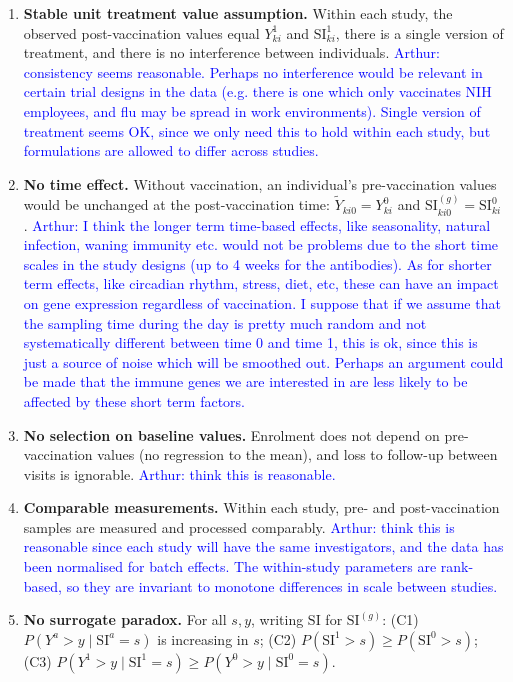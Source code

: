 \documentclass{article}
\begin{document}
\begin{enumerate}
    \item \textbf{Stable unit treatment value assumption.} Within each study, the observed post-vaccination values equal $Y^{1}_{ki}$ and $\mathrm{SI}^{1}_{ki}$, there is a single version of treatment, and there is no interference between individuals.
    \textcolor{blue}{Arthur: consistency seems reasonable. Perhaps no interference would be relevant in certain trial designs in the data (e.g. there is one which only vaccinates NIH employees, and flu may be spread in work environments). Single version of treatment seems OK, since we only need this to hold within each study, but formulations are allowed to differ across studies.}
    \item \textbf{No time effect.} Without vaccination, an individual's pre-vaccination values would be unchanged at the post-vaccination time: $\tilde{Y}_{ki0} = Y^{0}_{ki}$ and $\mathrm{SI}^{(g)}_{ki0} = \mathrm{SI}^{0}_{ki}$.
    \textcolor{blue}{Arthur: I think the longer term time-based effects, like seasonality, natural infection, waning immunity etc. would not be problems due to the short time scales in the study designs (up to 4 weeks for the antibodies). As for shorter term effects, like circadian rhythm, stress, diet, etc, these can have an impact on gene expression regardless of vaccination. I suppose that if we assume that the sampling time during the day is pretty much random and not systematically different between time 0 and time 1, this is ok, since this is just a source of noise which will be smoothed out. Perhaps an argument could be made that the immune genes we are interested in are less likely to be affected by these short term factors.}
    \item \textbf{No selection on baseline values.} Enrolment does not depend on pre-vaccination values (no regression to the mean), and loss to follow-up between visits is ignorable. \textcolor{blue}{Arthur: think this is reasonable.}
    \item \textbf{Comparable measurements.} Within each study, pre- and post-vaccination samples are measured and processed comparably.
    \textcolor{blue}{Arthur: think this is reasonable since each study will have the same investigators, and the data has been normalised for batch effects. The within-study parameters are rank-based, so they are invariant to monotone differences in scale between studies.}
    \item \textbf{No surrogate paradox.} For all $s, y$, writing $\mathrm{SI}$ for $\mathrm{SI}^{(g)}$: (C1) $P(Y^{a} > y \mid \mathrm{SI}^{a} = s)$ is increasing in $s$; (C2) $P(\mathrm{SI}^{1} > s) \ge P(\mathrm{SI}^{0} > s)$; (C3) $P(Y^{1} > y \mid \mathrm{SI}^{1} = s) \ge P(Y^{0} > y \mid \mathrm{SI}^{0} = s)$.

\end{enumerate}
\end{document}
